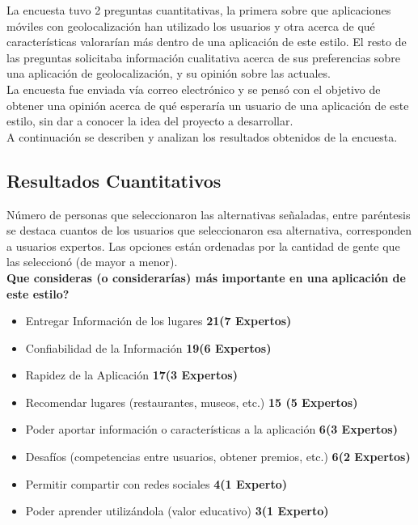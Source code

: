 \documentclass[10pt,letterpaper]{article}
\begin{document}
La encuesta tuvo 2 preguntas cuantitativas, la primera sobre que aplicaciones móviles con geolocalización han utilizado los usuarios y otra acerca de qué características valorarían más dentro de una aplicación de este estilo. El resto de las preguntas solicitaba información cualitativa acerca de sus preferencias sobre una aplicación de geolocalización, y su opinión sobre las actuales.\\

La encuesta fue enviada vía correo electrónico y se pensó con el objetivo de obtener una opinión acerca de qué esperaría un usuario de una aplicación de este estilo, sin dar a conocer la idea del proyecto a desarrollar.\\

A continuación se describen y analizan los resultados obtenidos de la encuesta.\\

\subsection{Resultados Cuantitativos}

Número de personas que seleccionaron las alternativas señaladas, entre paréntesis se destaca cuantos de los usuarios que seleccionaron esa alternativa, corresponden a usuarios expertos. Las opciones están ordenadas por la cantidad de gente que las seleccionó (de mayor a menor).\\

\textbf{Que consideras (o considerarías) más importante en una aplicación de este estilo?}\\

\begin{itemize}
\item Entregar Información de los lugares \textbf{21(7 Expertos)}
\item Confiabilidad de la Información \textbf{19(6 Expertos)}
\item Rapidez de la Aplicación \textbf{17(3 Expertos)}
\item Recomendar lugares (restaurantes, museos, etc.) \textbf{15 (5 Expertos)}
\item Poder aportar información o características a la aplicación \textbf{6(3 Expertos)}
\item Desafíos (competencias entre usuarios, obtener premios, etc.) \textbf{6(2 Expertos)}
\item Permitir compartir con redes sociales \textbf{4(1 Experto)}
\item Poder aprender utilizándola (valor educativo) \textbf{3(1 Experto)}
\end{itemize}
\end{document}
